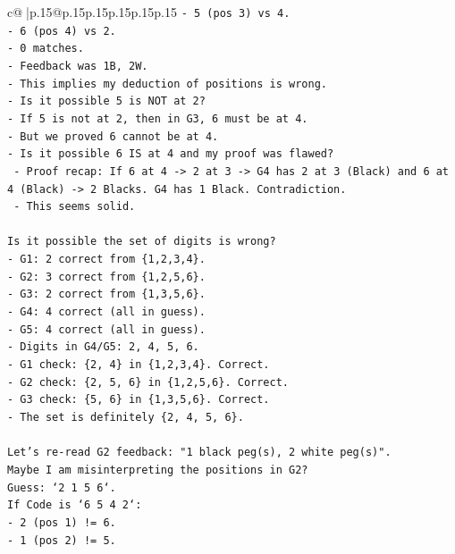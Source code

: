 \documentclass{article}
\begin{document}
{\begin{supertabular}{c@{$\;$}|p{.15\linewidth}@{}p{.15\linewidth}p{.15\linewidth}p{.15\linewidth}p{.15\linewidth}p{.15\linewidth}}
{{{\texttt{{-} 5 (pos 3) vs 4.} \\
\texttt{{-} 6 (pos 4) vs 2.} \\
\texttt{{-} 0 matches.} \\
\texttt{{-} Feedback was 1B, 2W.} \\
\texttt{{-} This implies my deduction of positions is wrong.} \\
\texttt{{-} Is it possible 5 is NOT at 2?} \\
\texttt{{-} If 5 is not at 2, then in G3, 6 must be at 4.} \\
\texttt{{-} But we proved 6 cannot be at 4.} \\
\texttt{{-} Is it possible 6 IS at 4 and my proof was flawed?} \\
\texttt{  {-} Proof recap: If 6 at 4 {-}> 2 at 3 {-}> G4 has 2 at 3 (Black) and 6 at 4 (Black) {-}> 2 Blacks. G4 has 1 Black. Contradiction.} \\
\texttt{  {-} This seems solid.} \\
\\ 
\texttt{Is it possible the set of digits is wrong?} \\
\texttt{{-} G1: 2 correct from \{1,2,3,4\}.} \\
\texttt{{-} G2: 3 correct from \{1,2,5,6\}.} \\
\texttt{{-} G3: 2 correct from \{1,3,5,6\}.} \\
\texttt{{-} G4: 4 correct (all in guess).} \\
\texttt{{-} G5: 4 correct (all in guess).} \\
\texttt{{-} Digits in G4/G5: 2, 4, 5, 6.} \\
\texttt{{-} G1 check: \{2, 4\} in \{1,2,3,4\}. Correct.} \\
\texttt{{-} G2 check: \{2, 5, 6\} in \{1,2,5,6\}. Correct.} \\
\texttt{{-} G3 check: \{5, 6\} in \{1,3,5,6\}. Correct.} \\
\texttt{{-} The set is definitely \{2, 4, 5, 6\}.} \\
\\ 
\texttt{Let's re{-}read G2 feedback: "1 black peg(s), 2 white peg(s)".} \\
\texttt{Maybe I am misinterpreting the positions in G2?} \\
\texttt{Guess: `2 1 5 6`.} \\
\texttt{If Code is `6 5 4 2`:} \\
\texttt{{-} 2 (pos 1) != 6.} \\
\texttt{{-} 1 (pos 2) != 5.} \\
}}}
\end{supertabular}}
\end{document}

